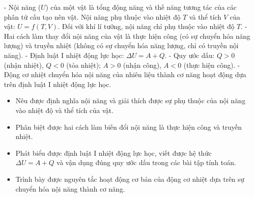 
\begin{kienthuc}
- Nội năng ($U$) của một vật là tổng động năng và thế năng tương tác của các phân tử cấu tạo nên vật. Nội năng phụ thuộc vào nhiệt độ $T$ và thể tích $V$ của vật: $U = f(T, V)$. Đối với khí lí tưởng, nội năng chỉ phụ thuộc vào nhiệt độ $T$.
- Hai cách làm thay đổi nội năng của vật là thực hiện công (có sự chuyển hóa năng lượng) và truyền nhiệt (không có sự chuyển hóa năng lượng, chỉ có truyền nội năng).
- Định luật I nhiệt động lực học: $\Delta U = A + Q$.
- Quy ước dấu: $Q > 0$ (nhận nhiệt), $Q < 0$ (tỏa nhiệt); $A > 0$ (nhận công), $A < 0$ (thực hiện công).
- Động cơ nhiệt chuyển hóa nội năng của nhiên liệu thành cơ năng hoạt động dựa trên định luật I nhiệt động lực học.
\end{kienthuc}

\begin{emdahoc}
\begin{itemize}
    \item Nêu được định nghĩa nội năng và giải thích được sự phụ thuộc của nội năng vào nhiệt độ và thể tích của vật.
    \item Phân biệt được hai cách làm biến đổi nội năng là thực hiện công và truyền nhiệt.
    \item Phát biểu được định luật I nhiệt động lực học, viết được hệ thức $\Delta U = A + Q$ và vận dụng đúng quy ước dấu trong các bài tập tính toán.
    \item Trình bày được nguyên tắc hoạt động cơ bản của động cơ nhiệt dựa trên sự chuyển hóa nội năng thành cơ năng.
\end{itemize}
\end{emdahoc}

